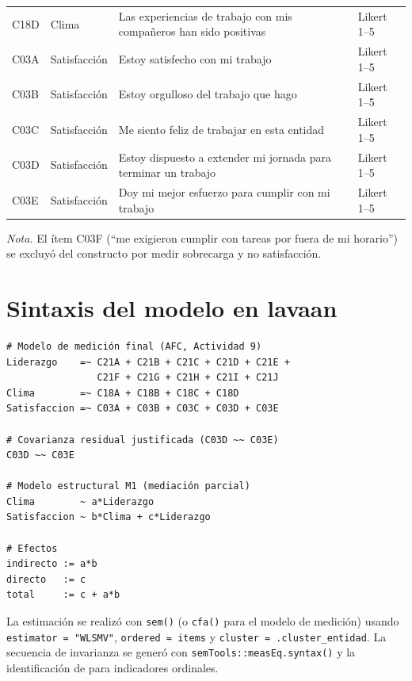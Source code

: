 \documentclass[11pt,a4paper]{article}
\begin{document}
\begin{longtable}{@{}llp{8.2cm}l@{}}
C18D & Clima & Las experiencias de trabajo con mis compañeros han sido positivas & Likert 1--5 \\
C03A & Satisfacción & Estoy satisfecho con mi trabajo & Likert 1--5 \\
C03B & Satisfacción & Estoy orgulloso del trabajo que hago & Likert 1--5 \\
C03C & Satisfacción & Me siento feliz de trabajar en esta entidad & Likert 1--5 \\
C03D & Satisfacción & Estoy dispuesto a extender mi jornada para terminar un trabajo & Likert 1--5 \\
C03E & Satisfacción & Doy mi mejor esfuerzo para cumplir con mi trabajo & Likert 1--5 \\
\end{longtable}

\noindent\textit{Nota.} El ítem C03F (``me exigieron cumplir con tareas por fuera de mi
horario'') se excluyó del constructo por medir sobrecarga y no satisfacción.

\section{Sintaxis del modelo en lavaan}\label{ap:sintaxis}

\begin{verbatim}
# Modelo de medición final (AFC, Actividad 9)
Liderazgo    =~ C21A + C21B + C21C + C21D + C21E +
                C21F + C21G + C21H + C21I + C21J
Clima        =~ C18A + C18B + C18C + C18D
Satisfaccion =~ C03A + C03B + C03C + C03D + C03E

# Covarianza residual justificada (C03D ~~ C03E)
C03D ~~ C03E

# Modelo estructural M1 (mediación parcial)
Clima        ~ a*Liderazgo
Satisfaccion ~ b*Clima + c*Liderazgo

# Efectos
indirecto := a*b
directo   := c
total     := c + a*b
\end{verbatim}

\noindent La estimación se realizó con \texttt{sem()} (o \texttt{cfa()} para el modelo de
medición) usando \texttt{estimator = "WLSMV"}, \texttt{ordered = items} y
\texttt{cluster = .cluster\_entidad}. La secuencia de invarianza se generó con
\texttt{semTools::measEq.syntax()} y la identificación de \citet{wu2016} para indicadores
ordinales.
\end{document}
